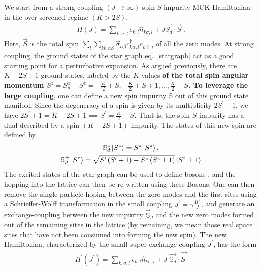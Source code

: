\documentclass[reprint,prb,superscriptaddress]{revtex4-1}
\begin{document}
We start from a strong coupling \((J \to \infty)\) spin-\(S\) impurity MCK Hamiltonian in the over-screened regime \(\left( K > 2S \right) \),
\begin{equation}\begin{aligned}
	\label{strong_ham}
	H(J) = \sum_{k,\sigma,l}\epsilon_{k,l} \hat n_{k\sigma,l} + J \vec{S_d}\cdot\vec{S}~.
\end{aligned}\end{equation}
Here, \(\vec S\) is the total spin \(\sum_l \sum_{kk^\prime \alpha\beta} \vec \sigma_{\alpha\beta}c^\dagger_{k\alpha,l}c_{k^\prime\beta,l}\) of all the zero modes. At strong coupling, the ground states of the star graph eq.~\ref{stargraph} act as a good starting point for a perturbative expansion. As argued previously, there are \(K-2S+1\) ground states, labeled by the \(K\) values \textbf{of the total spin angular momentum \(S^z = S_d^z + S^z = -\frac{K}{2} + S, -\frac{K}{2} + S + 1, \ldots, \frac{K}{2} - S\). To leverage the large coupling}, one can define a new spin impurity \(\mathbb{S}\) out of this ground state manifold. Since the degeneracy of a spin is given by its multiplicity \(2S^\prime + 1\), we have \(2S^\prime + 1 = K-2S+1 \implies S^\prime = \frac{K}{2} - S\). That is, the spin-\(S\) impurity has a dual described by a spin-\((K-2S+1)\) impurity. The states of this new spin are defined by
\begin{gather}
	\mathbb{S}_d^z \ket{S^z} = S^z \ket{S^z},\nonumber\\
	\mathbb{S}_d^\pm \ket{S^z} = \sqrt{S^\prime\left( S^\prime + 1 \right) - S^z\left( S^z \pm 1\right)} \ket{S^z \pm 1}
\end{gather}
The excited states of the star graph can be used to define bosons \cite{kroha_kolf_2007}, and the hopping into the lattice can then be re-written using these Bosons. One can then remove the single-particle hoping between the zero modes and the first sites using a Schrieffer-Wolff transformation in the small coupling \(J^\prime = \gamma \frac{4t^2}{J}\), and generate an exchange-coupling between the new impurity \(\vec {\mathbb{S}}_d\) and the new zero modes formed out of the remaining sites in the lattice \cite{kroha_kolf_2007} (by remaining, we mean those real space sites that have not been consumed into forming the new spin). The new Hamiltonian, characterized by the small super-exchange  coupling \(J^\prime\), has the form
\begin{equation}\begin{aligned}
	H^\prime(J^\prime) = \sum_{k,\sigma,l}\epsilon_{k,l} \hat n_{k\sigma,l} + J^\prime \vec{\mathbb{S}_d}\cdot\vec{S^\prime}
\end{aligned}\end{equation}
\end{document}
